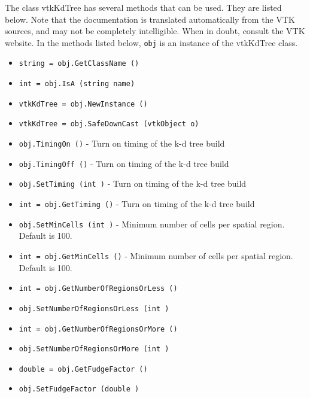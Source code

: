 The class vtkKdTree has several methods that can be used.
  They are listed below.
Note that the documentation is translated automatically from the VTK sources,
and may not be completely intelligible.  When in doubt, consult the VTK website.
In the methods listed below, \verb|obj| is an instance of the vtkKdTree class.
\begin{itemize}
\item  \verb|string = obj.GetClassName ()|

\item  \verb|int = obj.IsA (string name)|

\item  \verb|vtkKdTree = obj.NewInstance ()|

\item  \verb|vtkKdTree = obj.SafeDownCast (vtkObject o)|

\item  \verb|obj.TimingOn ()| -   Turn on timing of the k-d tree build

\item  \verb|obj.TimingOff ()| -   Turn on timing of the k-d tree build

\item  \verb|obj.SetTiming (int )| -   Turn on timing of the k-d tree build

\item  \verb|int = obj.GetTiming ()| -   Turn on timing of the k-d tree build

\item  \verb|obj.SetMinCells (int )| -   Minimum number of cells per spatial region.  Default is 100.

\item  \verb|int = obj.GetMinCells ()| -   Minimum number of cells per spatial region.  Default is 100.

\item  \verb|int = obj.GetNumberOfRegionsOrLess ()|

\item  \verb|obj.SetNumberOfRegionsOrLess (int )|

\item  \verb|int = obj.GetNumberOfRegionsOrMore ()|

\item  \verb|obj.SetNumberOfRegionsOrMore (int )|

\item  \verb|double = obj.GetFudgeFactor ()|

\item  \verb|obj.SetFudgeFactor (double )|


\end{itemize}
